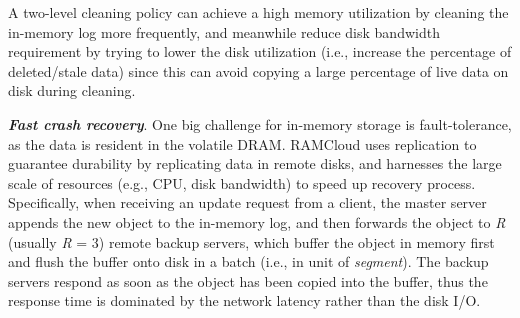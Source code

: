 \documentclass[twocolumn]{article}
\begin{document}
A two-level cleaning policy can achieve a high memory utilization by
cleaning the in-memory log more frequently, and meanwhile reduce disk
bandwidth requirement by trying to lower the disk utilization (i.e.,
increase the percentage of deleted/stale data) since this can avoid
copying a large percentage of live data on disk during cleaning.

\noindent
\textbf{\emph{Fast crash recovery}}. One big challenge for in-memory storage is
fault-tolerance, as the data is resident in the volatile
DRAM. 
RAMCloud uses replication to guarantee durability by replicating data in remote disks,
and harnesses the large scale of resources (e.g., CPU, disk bandwidth)
to speed up recovery process. Specifically, when receiving an update
request from a client, the master server appends the new object to the
in-memory log, and then forwards the object to \emph{R} (usually
\emph{R} = 3) remote backup servers, which buffer the object in memory
first and flush the buffer onto disk in a batch (i.e., in unit of
\emph{segment}). The backup servers respond as soon as the object has
been copied into the buffer, thus the response time is dominated by the
network latency rather than the disk I/O.
\end{document}
